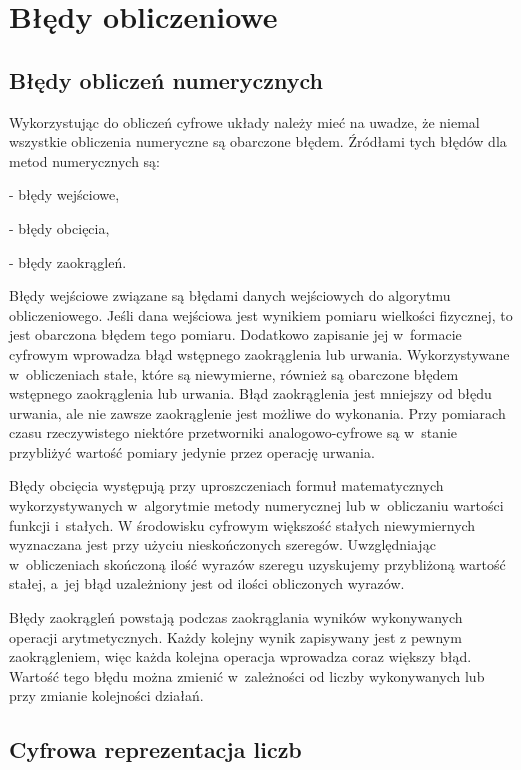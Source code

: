 \section{Błędy obliczeniowe}\label{sec:errors}

\subsection{Błędy obliczeń numerycznych}\label{sec:numerr}

Wykorzystując do obliczeń cyfrowe układy należy mieć na uwadze, że niemal wszystkie obliczenia numeryczne są obarczone błędem. Źródłami tych błędów dla metod numerycznych są:

- błędy wejściowe,

- błędy obcięcia,

- błędy zaokrągleń.

Błędy wejściowe związane są błędami danych wejściowych do algorytmu obliczeniowego. Jeśli dana wejściowa jest wynikiem pomiaru wielkości fizycznej, to jest obarczona błędem tego pomiaru. Dodatkowo zapisanie jej w~formacie cyfrowym wprowadza błąd wstępnego zaokrąglenia lub urwania. Wykorzystywane w~obliczeniach stałe, które są niewymierne, również są obarczone błędem wstępnego zaokrąglenia lub urwania. Błąd zaokrąglenia jest mniejszy od błędu urwania, ale nie zawsze zaokrąglenie jest możliwe do wykonania. Przy pomiarach czasu rzeczywistego niektóre przetworniki analogowo-cyfrowe są w~stanie przybliżyć wartość pomiary jedynie przez operację urwania.

Błędy obcięcia występują przy uproszczeniach formuł matematycznych wykorzystywanych w~algorytmie metody numerycznej lub w~obliczaniu wartości funkcji i~stałych. W środowisku cyfrowym większość stałych niewymiernych wyznaczana jest przy użyciu nieskończonych szeregów. Uwzględniając w~obliczeniach skończoną ilość wyrazów szeregu uzyskujemy przybliżoną wartość stałej, a~jej błąd uzależniony jest od ilości obliczonych wyrazów.

Błędy zaokrągleń powstają podczas zaokrąglania wyników wykonywanych operacji arytmetycznych. Każdy kolejny wynik zapisywany jest z pewnym zaokrągleniem, więc każda kolejna operacja wprowadza coraz większy błąd. Wartość tego błędu można zmienić w~zależności od liczby wykonywanych lub przy zmianie kolejności działań. 

\subsection{Cyfrowa reprezentacja liczb}\label{sec:numera}

